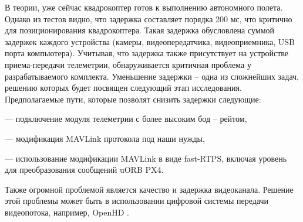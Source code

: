 В теории, уже сейчас квадрокоптер готов к выполнению автономного полета. Однако из тестов видно, что задержка составляет порядка 200 мс, что критично для позиционирования квадрокоптера. Такая задержка обусловлена суммой задержек каждого устройства (камеры, видеопередатчика, видеоприемника, USB порта компьютера). Учитывая, что задержка также присутствует на устройстве приема-передачи телеметрии, обнаруживается критичная проблема у разрабатываемого комплекта. Уменьшение задержки -- одна из сложнейших задач, решению которых будет посвящен следующий этап исследования. Предполагаемые пути, которые позволят снизить задержки следующие:

--- подключение модуля телеметрии с более высоким бод -- рейтом,

--- модификация MAVLink протокола под наши нужды,

--- использование модификации MAVLink в виде fast-RTPS, включая уровень для преобразования сообщений uORB PX4.

Также огромной проблемой является качество и задержка видеоканала. Решение этой проблемы может быть в использовании цифровой системы передачи видеопотока, например, OpenHD \cite{openhd}.

